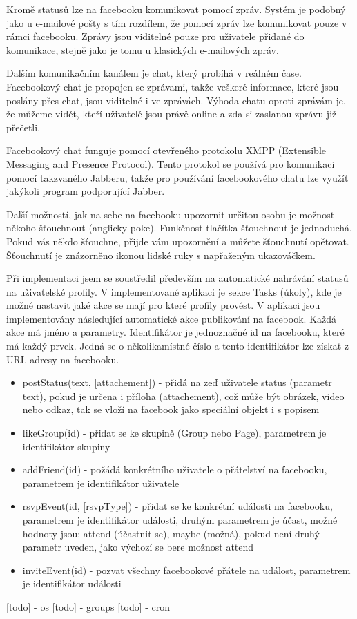\documentclass[thesis=M,czech]{FITthesis}[2013/05/10]
\begin{document}
Kromě statusů lze na facebooku komunikovat pomocí zpráv. Systém je podobný jako u e-mailové pošty s tím rozdílem, že pomocí zpráv lze komunikovat pouze  v rámci facebooku. Zprávy jsou viditelné pouze pro uživatele přidané do komunikace, stejně jako je tomu u klasických e-mailových zpráv. 

Dalším komunikačním kanálem je chat, který probíhá v reálném čase. Facebookový chat je propojen se zprávami, takže veškeré informace, které jsou poslány přes chat, jsou viditelné i ve zprávách. Výhoda chatu oproti zprávám je, že  můžeme vidět, kteří uživatelé jsou právě online a zda si zaslanou zprávu již přečetli. 

Facebookový chat funguje pomocí otevřeného protokolu XMPP (Extensible Messaging and Presence Protocol). Tento protokol se používá pro komunikaci pomocí takzvaného Jabberu, takže pro používání facebookového chatu lze využít jakýkoli program podporující Jabber.

Další možností, jak na sebe na facebooku upozornit určitou osobu je možnost někoho šťouchnout (anglicky poke). Funkčnost tlačítka šťouchnout je jednoduchá. Pokud vás někdo šťouchne, přijde vám upozornění a můžete šťouchnutí opětovat. Šťouchnutí je znázorněno ikonou lidské ruky s napřaženým ukazováčkem.

Při implementaci jsem se soustředil především na automatické nahrávání statusů na uživatelské profily. V implementované aplikaci je sekce Tasks (úkoly), kde je možné nastavit jaké akce se mají pro které profily provést. V aplikaci jsou implementovány následující automatické akce publikování na facebook. Každá akce má jméno a parametry. Identifikátor je jednoznačné id na facebooku, které má každý prvek. Jedná se o několikamístné číslo a tento identifikátor lze získat z URL adresy na facebooku.

\begin{itemize}
  \item postStatus(text, [attachement]) - přidá na zeď uživatele status (parametr text), pokud je určena i příloha (attachement), což může být obrázek, video nebo odkaz, tak se vloží na facebook jako speciální objekt i s popisem
  \item likeGroup(id) - přidat se ke skupině (Group nebo Page), parametrem je identifikátor skupiny 
  \item addFriend(id) - požádá konkrétního uživatele o přátelství na facebooku, parametrem je identifikátor uživatele
  \item rsvpEvent(id, [rsvpType]) - přidat se ke konkrétní události na facebooku, parametrem je identifikátor události, druhým parametrem je účast, možné hodnoty jsou: attend (účastnit se), maybe (možná), pokud není druhý parametr uveden, jako výchozí se bere možnost attend
  \item inviteEvent(id) - pozvat všechny facebookové přátele na událost, parametrem je identifikátor události
\end{itemize}
[todo] - os
[todo] - groups
[todo] - cron
\end{document}
